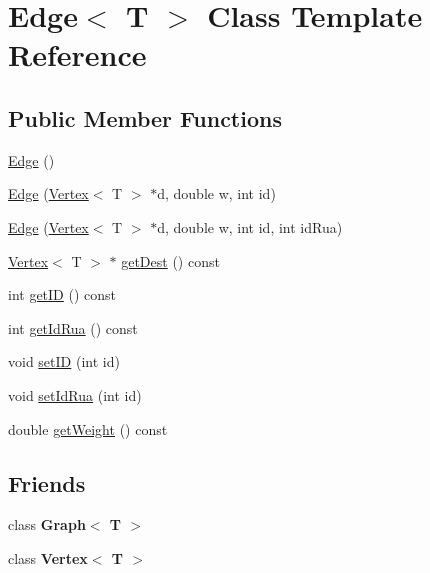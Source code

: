 \hypertarget{class_edge}{}\section{Edge$<$ T $>$ Class Template Reference}
\label{class_edge}
\subsection*{Public Member Functions}
\begin{DoxyCompactItemize}
\item 
\hyperlink{class_edge_a15b7017ce7b7cac044d8422727e2bf77}{Edge} ()
\item 
\hyperlink{class_edge_a5add774efcea94577be9050a531a1d72}{Edge} (\hyperlink{class_vertex}{Vertex}$<$ T $>$ $\ast$d, double w, int id)
\item 
\hyperlink{class_edge_a2df110af8c1acb39ad74cb60a99db814}{Edge} (\hyperlink{class_vertex}{Vertex}$<$ T $>$ $\ast$d, double w, int id, int id\+Rua)
\item 
\hyperlink{class_vertex}{Vertex}$<$ T $>$ $\ast$ \hyperlink{class_edge_a9a2de066dff8513dd788d553fc1d0c81}{get\+Dest} () const
\item 
int \hyperlink{class_edge_a7fc99513075d0b4fa36b439382be704e}{get\+ID} () const
\item 
int \hyperlink{class_edge_a2abecff6ce38cb2b4d5483bbf89f8eb1}{get\+Id\+Rua} () const
\item 
void \hyperlink{class_edge_ac146f766ba24b17954cc02a78ad99464}{set\+ID} (int id)
\item 
void \hyperlink{class_edge_ab9dd68e497ed9abdf8f5f97215045acc}{set\+Id\+Rua} (int id)
\item 
double \hyperlink{class_edge_a3df378e283d6c8be5be4170ac8d7f4e8}{get\+Weight} () const
\end{DoxyCompactItemize}
\subsection*{Friends}
\begin{DoxyCompactItemize}
\item 
\mbox{\label{class_edge_aefa9b76cd57411c5354e5620dc2d84dd}} 
class {\bfseries Graph$<$ T $>$}
\item 
\mbox{\label{class_edge_a2e120a12dec663fa334633b4f26cbed8}} 
class {\bfseries Vertex$<$ T $>$}
\end{DoxyCompactItemize}


